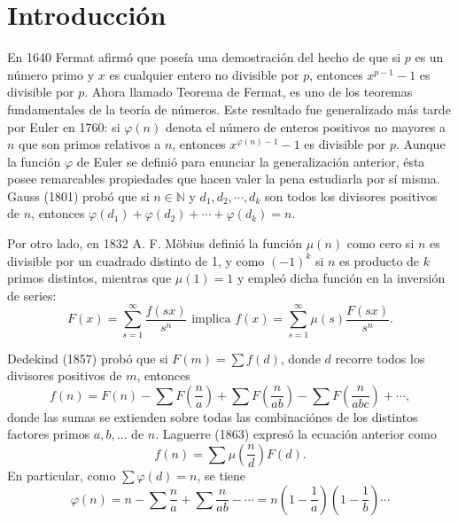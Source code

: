 \newpage
\pagestyle{title-subsection}
\section*{Introducción}

En 1640 Fermat afirmó que poseía una demostración del hecho de que si $p$ es un número primo y $x$ es cualquier entero no divisible por $p$, entonces $x^{p-1}-1$ es divisible por $p$. Ahora llamado Teorema de Fermat, es uno de los teoremas fundamentales de la teoría de números. Este resultado fue generalizado más tarde por Euler en 1760: si $\varphi(n)$ denota el número de enteros positivos no mayores a $n$ que son primos relativos a $n$, entonces $x^{\varphi(n)-1}-1$ es divisible por $p$.
Aunque la función $\varphi$ de Euler se definió para enunciar la generalización anterior, ésta posee remarcables propiedades que hacen valer la pena estudiarla por sí misma. Gauss (1801) probó que si $n\in\mathbb{N}$ y $d_1,d_2,\cdots,d_k$ son todos los divisores positivos de $n$, entonces $\varphi(d_1)+\varphi(d_2)+\cdots+\varphi(d_k)=n$.
\bigskip

Por otro lado, en 1832 A. F. Möbius definió la función $\mu(n)$ como cero si $n$ es divisible por un cuadrado distinto de 1, y como $(-1)^k$ si $n$ es producto de $k$ primos distintos, mientras que $\mu(1)=1$ y empleó dicha función en la inversión de series:
\begin{equation*}
    F(x) = \sum_{s=1}^{\infty} \frac{f(s x)}{s^n} \text{ implica } f(x) = \sum_{s=1}^{\infty} \mu(s) \frac{F(s x)}{s^n}.
\end{equation*}

Dedekind (1857) probó que si $F(m) = \sum f(d)$, donde $d$ recorre todos los divisores positivos de $m$, entonces
\begin{equation*}
    f(n) = F(n) - \sum F \left( \frac{n}{a} \right) + \sum F \left(  \frac{n}{a b} \right) - \sum F \left( \frac{n}{a b c} \right) + \cdots,
\end{equation*}
donde las sumas se extienden sobre todas las combinaciónes de los distintos factores primos $a, b, \ldots$ de $n$. Laguerre (1863) expresó la ecuación anterior como
\begin{equation*}
    f(n) = \sum \mu \left(  \frac{n}{d} \right) F(d).
\end{equation*}
En particular, como $\sum \varphi(d) = n$, se tiene
\begin{equation*}
    \varphi(n) = n - \sum \frac{n}{a} + \sum \frac{n}{a b} - \cdots = n \left( 1 - \frac{1}{a} \right) \left( 1 - \frac{1}{b} \right) \cdots
\end{equation*}


